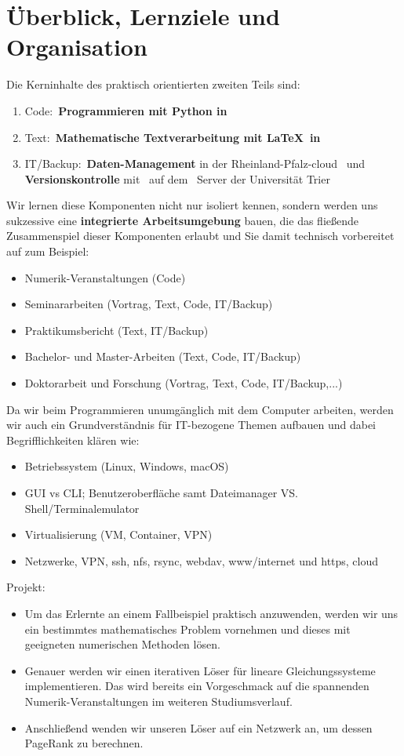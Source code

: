 \section*{Überblick, Lernziele und Organisation}

Die Kerninhalte des praktisch orientierten zweiten Teils sind:
\begin{enumerate}
	\item Code:~\textbf{Programmieren mit Python in \pycharm}
	\item Text:~\textbf{Mathematische Textverarbeitung mit \LaTeX~in \texstudio}
	\item IT/Backup:~\textbf{Daten-Management} in der Rheinland-Pfalz-cloud \seafile\ und \textbf{Versionskontrolle} mit \git~auf dem \gitlab~Server der Universität Trier
\end{enumerate}
Wir lernen diese Komponenten nicht nur isoliert kennen, sondern werden uns sukzessive eine \textbf{integrierte Arbeitsumgebung} bauen, die das fließende Zusammenspiel dieser Komponenten erlaubt und Sie damit technisch vorbereitet auf zum Beispiel:
\begin{itemize}
	\item Numerik-Veranstaltungen (Code)
	\item Seminararbeiten (Vortrag, Text, Code, IT/Backup)
	\item Praktikumsbericht (Text, IT/Backup)
	\item Bachelor- und Master-Arbeiten (Text, Code, IT/Backup)
	\item Doktorarbeit und Forschung (Vortrag, Text, Code, IT/Backup,...)
\end{itemize}
Da wir beim Programmieren unumgänglich mit dem Computer arbeiten, werden wir auch ein Grundverständnis für IT-bezogene Themen aufbauen und dabei Begrifflichkeiten klären wie:
\begin{itemize}
	\item Betriebssystem (Linux, Windows, macOS)
	\item GUI vs CLI; Benutzeroberfläche samt Dateimanager VS. Shell/Terminalemulator
	\item Virtualisierung (VM, Container, VPN)
	\item Netzwerke, VPN, ssh, nfs, rsync, webdav, www/internet und https, cloud
\end{itemize}
Projekt:
\begin{itemize}
	\item Um das Erlernte an einem Fallbeispiel praktisch anzuwenden, werden wir uns ein bestimmtes mathematisches Problem vornehmen und dieses mit geeigneten numerischen Methoden lösen.
	\item Genauer werden wir einen iterativen Löser für lineare Gleichungssysteme implementieren. Das wird bereits ein Vorgeschmack auf die spannenden Numerik-Veranstaltungen im weiteren Studiumsverlauf.
	\item Anschließend wenden wir unseren Löser auf ein Netzwerk an, um dessen PageRank zu berechnen.
\end{itemize}
